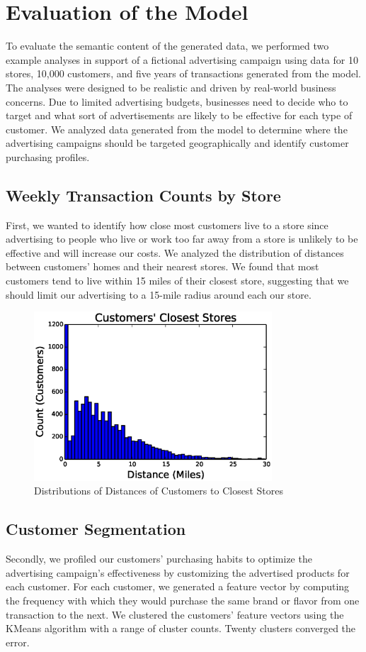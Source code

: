 \documentclass[conference]{IEEEtran}
\begin{document}
\section{Evaluation of the Model}
To evaluate the semantic content of the generated data, we performed two example analyses in support of a fictional advertising campaign using data for 10 stores, 10,000 customers, and five years of transactions generated from the model. The analyses were designed to be realistic and driven by real-world business concerns.  Due to limited advertising budgets, businesses need to decide who to target and what sort of advertisements are likely to be effective for each type of customer.  We analyzed data generated from the model to determine where the advertising campaigns should be targeted geographically and identify customer purchasing profiles.

\subsection{Weekly Transaction Counts by Store}
First, we wanted to identify how close most customers live to a store since advertising to people who live or work too far away from a store is unlikely to be effective and will increase our costs. We analyzed the distribution of distances between customers' homes and their nearest stores.  We found that most customers tend to live within 15 miles of their closest store, suggesting that we should limit our advertising to a 15-mile radius around each our store.

\begin{figure}[!t]
  \centering
  \includegraphics[width=3.5in]{figures/customer_store_distances.eps}
  \caption{Distributions of Distances of Customers to Closest Stores}
  \label{fig:cluster_analysis}
\end{figure}

\subsection{Customer Segmentation}
Secondly, we profiled our customers' purchasing habits to optimize the advertising campaign's effectiveness by customizing the advertised products for each customer.  For each customer, we generated a feature vector by computing the frequency with which they would purchase the same brand or flavor from one transaction to the next.  We clustered the customers' feature vectors using the KMeans algorithm with a range of cluster counts. Twenty clusters converged the error.
\end{document}

